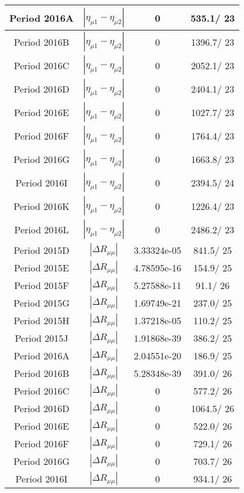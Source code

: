 \documentclass{article}
\begin{document}
\begin{longtable}{c|c|c|c}
\hline
 Period 2016A & $|\eta_{\mu1}-\eta_{\mu2}|$ & 0 & 535.1/ 23\\
\hline
 Period 2016B & $|\eta_{\mu1}-\eta_{\mu2}|$ & 0 & 1396.7/ 23\\
\hline
 Period 2016C & $|\eta_{\mu1}-\eta_{\mu2}|$ & 0 & 2052.1/ 23\\
\hline
 Period 2016D & $|\eta_{\mu1}-\eta_{\mu2}|$ & 0 & 2404.1/ 23\\
\hline
 Period 2016E & $|\eta_{\mu1}-\eta_{\mu2}|$ & 0 & 1027.7/ 23\\
\hline
 Period 2016F & $|\eta_{\mu1}-\eta_{\mu2}|$ & 0 & 1764.4/ 23\\
\hline
 Period 2016G & $|\eta_{\mu1}-\eta_{\mu2}|$ & 0 & 1663.8/ 23\\
\hline
 Period 2016I & $|\eta_{\mu1}-\eta_{\mu2}|$ & 0 & 2394.5/ 24\\
\hline
 Period 2016K & $|\eta_{\mu1}-\eta_{\mu2}|$ & 0 & 1226.4/ 23\\
\hline
 Period 2016L & $|\eta_{\mu1}-\eta_{\mu2}|$ & 0 & 2486.2/ 23\\
\hline
 Period 2015D & $|\Delta R_{\mu \mu}|$ & 3.33324e-05 & 841.5/ 25\\
\hline
 Period 2015E & $|\Delta R_{\mu \mu}|$ & 4.78595e-16 & 154.9/ 25\\
\hline
 Period 2015F & $|\Delta R_{\mu \mu}|$ & 5.27588e-11 &  91.1/ 26\\
\hline
 Period 2015G & $|\Delta R_{\mu \mu}|$ & 1.69749e-21 & 237.0/ 25\\
\hline
 Period 2015H & $|\Delta R_{\mu \mu}|$ & 1.37218e-05 & 110.2/ 25\\
\hline
 Period 2015J & $|\Delta R_{\mu \mu}|$ & 1.91868e-39 & 386.2/ 25\\
\hline
 Period 2016A & $|\Delta R_{\mu \mu}|$ & 2.04551e-20 & 186.9/ 25\\
\hline
 Period 2016B & $|\Delta R_{\mu \mu}|$ & 5.28348e-39 & 391.0/ 26\\
\hline
 Period 2016C & $|\Delta R_{\mu \mu}|$ & 0 & 577.2/ 26\\
\hline
 Period 2016D & $|\Delta R_{\mu \mu}|$ & 0 & 1064.5/ 26\\
\hline
 Period 2016E & $|\Delta R_{\mu \mu}|$ & 0 & 522.0/ 26\\
\hline
 Period 2016F & $|\Delta R_{\mu \mu}|$ & 0 & 729.1/ 26\\
\hline
 Period 2016G & $|\Delta R_{\mu \mu}|$ & 0 & 703.7/ 26\\
\hline
 Period 2016I & $|\Delta R_{\mu \mu}|$ & 0 & 934.1/ 26\\

\end{longtable}
\end{document}
